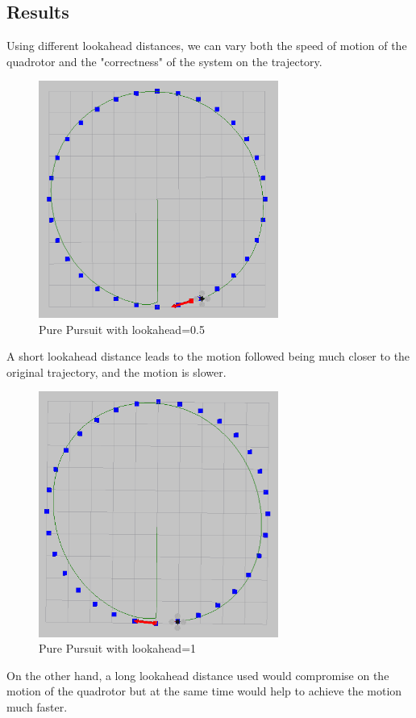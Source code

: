 \documentclass[hidelinks,BTech]{iitmdiss}
\begin{document}
\subsection{Results}
Using different lookahead distances, we can vary both the speed of motion of the quadrotor and the "correctness" of the system on the trajectory.
\begin{figure}[H]
  \centering
    \includegraphics[width=0.7\textwidth]{Pure_Pursuit_0_5.png}
    \caption{Pure Pursuit with lookahead=0.5}
\end{figure}
A short lookahead distance leads to the motion followed being much closer to the original trajectory, and the motion is slower.

\begin{figure}[H]
  \centering
    \includegraphics[width=0.7\textwidth]{Pure_Pursuit_1.png}
    \caption{Pure Pursuit with lookahead=1}
\end{figure}
On the other hand, a long lookahead distance used would compromise on the motion of the quadrotor but at the same time would help to achieve the motion much faster.
\end{document}

